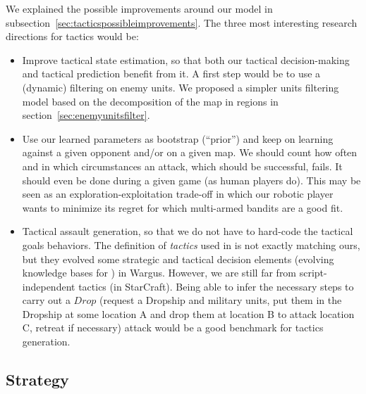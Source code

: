 We explained the possible improvements around our model in subsection~\ref{sec:tacticspossibleimprovements}. The three most interesting research directions for tactics would be:
\begin{itemize}
    \item Improve tactical state estimation, so that both our tactical decision-making and tactical prediction benefit from it. A first step would be to use a (dynamic) filtering on enemy units. We proposed a simpler units filtering model based on the decomposition of the map in regions in section~\ref{sec:enemyunitsfilter}.

    \item Use our learned parameters as bootstrap (``prior'') and keep on learning against a given opponent and/or on a given map. We should count how often and in which circumstances an attack, which should be successful, fails. It should even be done during a given game (as human players do). This may be seen as an exploration-exploitation trade-off in which our robotic player wants to minimize its regret for which multi-armed bandits \citep{Kuleshov2000} are a good fit.%

    \item Tactical assault generation, so that we do not have to hard-code the tactical goals behaviors. The definition of \textit{tactics} used in \citep{PonsenMSA06} is not exactly matching ours, but they evolved some strategic and tactical decision elements (evolving knowledge bases for ) in Wargus. However, we are still far from script-independent tactics (in StarCraft). Being able to infer the necessary steps to carry out a $Drop$ (request a Dropship and military units, put them in the Dropship at some location A and drop them at location B to attack location C, retreat if necessary) attack would be a good benchmark for tactics generation.
\end{itemize}


\subsection{Strategy}

